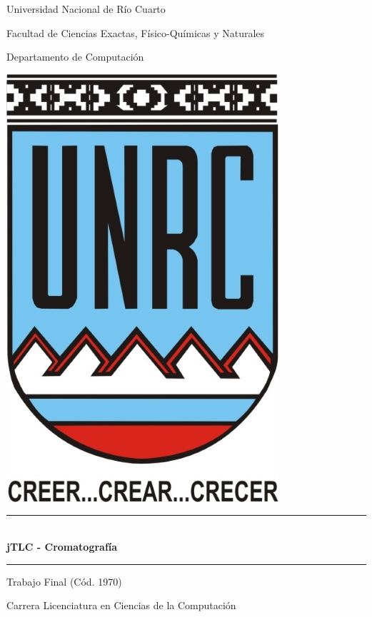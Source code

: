\documentclass[12pt]{report}
\begin{document}
	\begin{titlepage}
		\begin{center}
			{\huge Universidad Nacional de R\'io Cuarto}\vspace{.2cm}
			
			{\large  Facultad de Ciencias Exactas, F\'isico-Qu\'imicas y Naturales}\vspace{.2cm}
			
			{\Large  Departamento de Computaci\'on}\vspace{.3cm}
			
			\includegraphics{imagenes/escudo}\vspace{.3cm}
			
			\rule{10cm}{.01cm} \vspace{.5cm}\\
			{\LARGE \textbf{jTLC - Cromatograf\'ia}}
			\rule{10cm}{.01cm} \vspace{1cm}
			
			{\Large Trabajo Final (C\'od. 1970)
			
			Carrera Licenciatura en Ciencias de la Computaci\'on \vspace{1cm}}
			

\end{center}
\end{titlepage}
\end{document}
